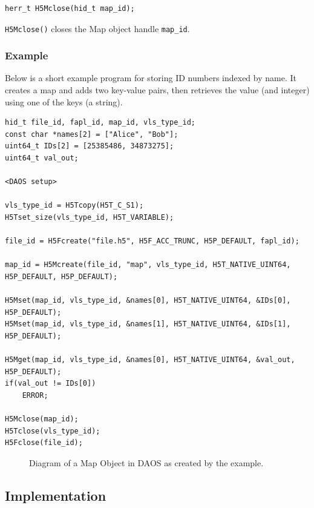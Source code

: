 {
\begin{lstlisting}
herr_t H5Mclose(hid_t map_id);
\end{lstlisting}
}

\verb+H5Mclose()+ closes the Map object handle \verb+map_id+.

\subsubsection{Example}

Below is a short example program for storing ID numbers indexed by name. It creates a map and adds two key-value pairs, then retrieves the value (and integer) using one of the keys (a string).
{
\begin{lstlisting}
hid_t file_id, fapl_id, map_id, vls_type_id;
const char *names[2] = ["Alice", "Bob"];
uint64_t IDs[2] = [25385486, 34873275];
uint64_t val_out;

<DAOS setup>

vls_type_id = H5Tcopy(H5T_C_S1);
H5Tset_size(vls_type_id, H5T_VARIABLE);

file_id = H5Fcreate("file.h5", H5F_ACC_TRUNC, H5P_DEFAULT, fapl_id);

map_id = H5Mcreate(file_id, "map", vls_type_id, H5T_NATIVE_UINT64, H5P_DEFAULT, H5P_DEFAULT);

H5Mset(map_id, vls_type_id, &names[0], H5T_NATIVE_UINT64, &IDs[0], H5P_DEFAULT);
H5Mset(map_id, vls_type_id, &names[1], H5T_NATIVE_UINT64, &IDs[1], H5P_DEFAULT);

H5Mget(map_id, vls_type_id, &names[0], H5T_NATIVE_UINT64, &val_out, H5P_DEFAULT);
if(val_out != IDs[0])
	ERROR;

H5Mclose(map_id);
H5Tclose(vls_type_id);
H5Fclose(file_id);
\end{lstlisting}
}

\begin{figure}
\caption{Diagram of a Map Object in DAOS as created by the example.}
\label{fig:map}
\end{figure}

\subsection{Implementation}

